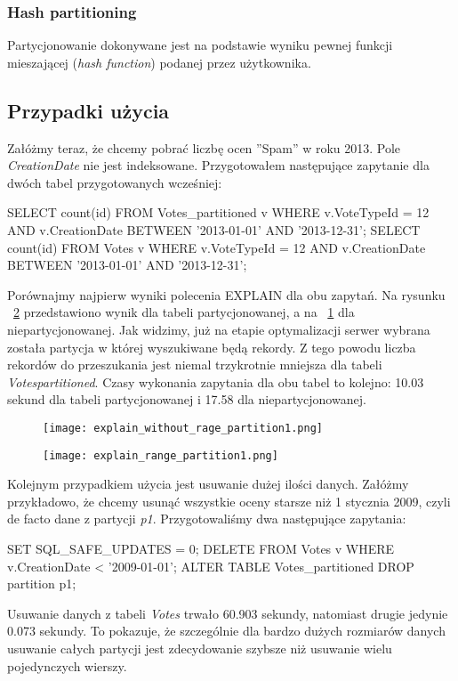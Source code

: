 \subsubsection{Hash partitioning}
Partycjonowanie dokonywane jest na podstawie wyniku pewnej funkcji mieszającej (\textit{hash function}) podanej przez użytkownika.

\subsection{Przypadki użycia}
Załóżmy teraz, że chcemy pobrać liczbę ocen ''Spam'' w roku 2013. Pole \textit{CreationDate} nie jest indeksowane. Przygotowałem następujące zapytanie dla dwóch tabel przygotowanych wcześniej:
\begin{spverbatim}
	SELECT count(id) FROM Votes_partitioned v WHERE v.VoteTypeId = 12 AND v.CreationDate BETWEEN '2013-01-01' AND '2013-12-31'; 
	SELECT count(id) FROM Votes v WHERE v.VoteTypeId = 12 AND v.CreationDate BETWEEN '2013-01-01' AND '2013-12-31';
\end{spverbatim}
Porównajmy najpierw wyniki polecenia EXPLAIN dla obu zapytań. Na rysunku ~\ref{fig:explain_range_partition1} przedstawiono wynik dla tabeli partycjonowanej, a na ~\ref{fig:explain_without_rage_partition1} dla niepartycjonowanej. Jak widzimy, już na etapie optymalizacji serwer wybrana została partycja w której wyszukiwane będą rekordy. Z tego powodu liczba rekordów do przeszukania jest niemal trzykrotnie mniejsza dla tabeli \textit{Votes\textunderscore partitioned}. Czasy wykonania zapytania dla obu tabel to kolejno: 10.03 sekund dla tabeli partycjonowanej i 17.58 dla niepartycjonowanej.
\begin{figure}
	\caption{}
	\centering
	\texttt{[image: explain\_without\_rage\_partition1.png]}
	\label{fig:explain_without_rage_partition1}
\end{figure}
\begin{figure}
	\caption{}
	\centering
	\texttt{[image: explain\_range\_partition1.png]}
	\label{fig:explain_range_partition1}
\end{figure}

Kolejnym przypadkiem użycia jest usuwanie dużej ilości danych. Załóżmy przykładowo, że chcemy usunąć wszystkie oceny starsze niż 1 stycznia 2009, czyli de facto dane z partycji \textit{p1}. Przygotowaliśmy dwa następujące zapytania:
\begin{spverbatim}
	SET SQL_SAFE_UPDATES = 0;
	DELETE FROM Votes v WHERE v.CreationDate < '2009-01-01';
	ALTER TABLE Votes_partitioned DROP partition p1;
\end{spverbatim}
Usuwanie danych z tabeli \textit{Votes} trwało 60.903 sekundy, natomiast drugie jedynie 0.073 sekundy. To pokazuje, że szczególnie dla bardzo dużych rozmiarów danych usuwanie całych partycji jest zdecydowanie szybsze niż usuwanie wielu pojedynczych wierszy.

